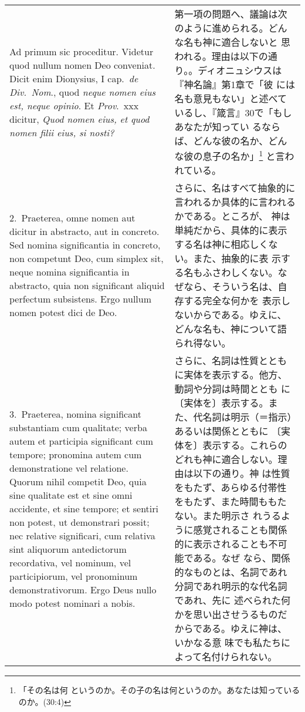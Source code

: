 \documentclass[10pt]{jsarticle}
\begin{document}
\begin{longtable}{p{21em}p{21em}}

{\sc Ad primum sic proceditur}. Videtur quod nullum nomen Deo
conveniat. Dicit enim Dionysius, I cap.\ {\it de Div.\ Nom}., quod {\it neque nomen
eius est, neque opinio}. Et {\it Prov}.\ {\sc xxx} dicitur, {\it Quod nomen eius, et quod nomen filii eius, si nosti?}

&

第一項の問題へ、議論は次のように進められる。どんな名も神に適合しないと
思われる。理由は以下の通り。。ディオニュシウスは『神名論』第1章で「彼
には名も意見もない」と述べているし、『箴言』30で「もしあなたが知ってい
るならば、どんな彼の名か、どんな彼の息子の名か」\footnote{「その名は何
というのか。その子の名は何というのか。あなたは知っているのか。(30:4)}
と言われている。

\\

2.~{\sc Praeterea}, omne nomen aut dicitur in abstracto, aut in
concreto. Sed nomina significantia in concreto, non competunt Deo, cum
simplex sit, neque nomina significantia in abstracto, quia non
significant aliquid perfectum subsistens. Ergo nullum nomen potest
dici de Deo.

&

さらに、名はすべて抽象的に言われるか具体的に言われるかである。ところが、
神は単純だから、具体的に表示する名は神に相応しくない。また、抽象的に表
示する名もふさわしくない。なぜなら、そういう名は、自存する完全な何かを
表示しないからである。ゆえに、どんな名も、神について語られ得ない。

\\

3.~{\sc Praeterea}, nomina significant substantiam cum qualitate;
verba autem et participia significant cum tempore; pronomina autem cum
demonstratione vel relatione. Quorum nihil competit Deo, quia sine
qualitate est et sine omni accidente, et sine tempore; et sentiri non
potest, ut demonstrari possit; nec relative significari, cum relativa
sint aliquorum antedictorum recordativa, vel nominum, vel
participiorum, vel pronominum demonstrativorum. Ergo Deus nullo modo
potest nominari a nobis.

&

さらに、名詞は性質とともに実体を表示する。他方、動詞や分詞は時間ととも
に〔実体を〕表示する。また、代名詞は明示（＝指示）あるいは関係とともに
〔実体を〕表示する。これらのどれも神に適合しない。理由は以下の通り。神
は性質をもたず、あらゆる付帯性をもたず、また時間ももたない。また明示さ
れうるように感覚されることも関係的に表示されることも不可能である。なぜ
なら、関係的なものとは、名詞であれ分詞であれ明示的な代名詞であれ、先に
述べられた何かを思い出させうるものだからである。ゆえに神は、いかなる意
味でも私たちによって名付けられない。


\end{longtable}
\end{document}
